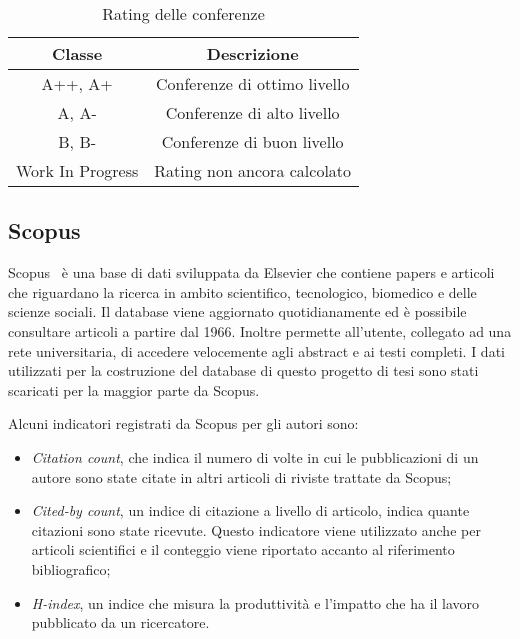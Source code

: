 \begin{table}
    \centering
    \begin{tabular}{||c c ||} 
     \hline
     Classe & Descrizione \\ [0.5ex] 
     \hline\hline
     A++, A+ & Conferenze di ottimo livello \\ 
     \hline
     A, A- & Conferenze di alto livello \\
     \hline
     B, B- & Conferenze di buon livello \\
     \hline
     Work In Progress & Rating non ancora calcolato \\
     \hline
    \end{tabular}
    \caption{Rating delle conferenze}
    \label{table:ratings}
\end{table}



\subsection{Scopus}\label{sec:scopus}

Scopus~\cite{scopus} è una base di dati sviluppata da Elsevier che contiene
papers e articoli che riguardano la ricerca in ambito scientifico, tecnologico,
biomedico e delle scienze sociali. Il database viene aggiornato quotidianamente
ed è possibile consultare articoli a partire dal 1966. Inoltre permette
all'utente, collegato ad una rete universitaria, di accedere velocemente agli
abstract e ai testi completi.
I dati utilizzati per la costruzione del database di questo progetto di tesi sono stati scaricati per la maggior parte da Scopus. 

Alcuni indicatori registrati da Scopus per gli autori sono:
\begin{itemize}
    \item \textit{Citation count}, che indica il numero di volte in cui le
    pubblicazioni di un autore sono state citate in altri articoli di riviste
    trattate da Scopus;
    \item \textit{Cited-by count}, un indice di citazione a livello di articolo,
    indica quante citazioni sono state ricevute. Questo indicatore viene
    utilizzato anche per articoli scientifici e il conteggio viene riportato
    accanto al riferimento bibliografico;
    \item \textit{H-index}, un indice che misura la produttività e l'impatto che
    ha il lavoro pubblicato da un ricercatore.
\end{itemize}

